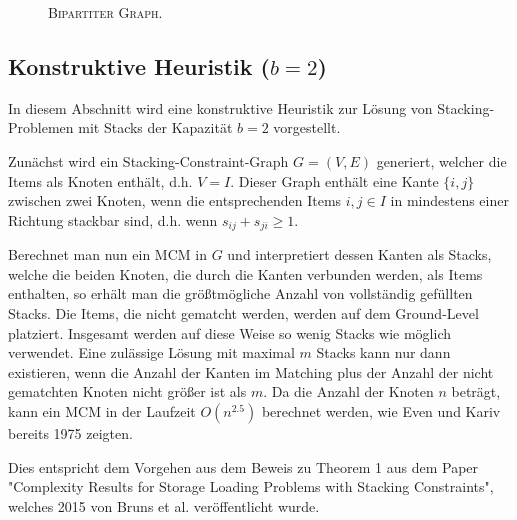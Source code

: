 \begin{figure}[H]
\centering
{}
\caption{\textsc{Bipartiter Graph.}}
\label{fig:digression_bipartite_graph}
\end{figure}

\subsection{Konstruktive Heuristik ($b = 2$)}
\label{sec:two_cap_heuristic}

In diesem Abschnitt wird eine konstruktive Heuristik zur Lösung von Stacking-Problemen mit Stacks der Kapazität $b=2$
vorgestellt.

Zunächst wird ein Stacking-Constraint-Graph $G = (V, E)$ generiert, welcher die Items als Knoten enthält, d.h. $V = I$. Dieser Graph
enthält eine Kante $\{i, j\}$ zwischen zwei Knoten, wenn die entsprechenden Items $i, j \in I$ in mindestens einer Richtung stackbar sind, d.h.
wenn $s_{ij} + s_{ji} \geq 1$.

Berechnet man nun ein \textsc{MCM} in $G$ und interpretiert dessen Kanten als Stacks, welche die beiden Knoten, die durch
die Kanten verbunden werden, als Items enthalten, so erhält man die größtmögliche Anzahl von vollständig gefüllten Stacks.
Die Items, die nicht gematcht werden, werden auf dem Ground-Level platziert.
Insgesamt werden auf diese Weise so wenig Stacks wie möglich verwendet.
Eine zulässige Lösung mit maximal $m$ Stacks kann nur dann existieren, wenn die Anzahl der Kanten im Matching plus der Anzahl der nicht gematchten Knoten nicht größer ist als $m$. Da die Anzahl der Knoten $n$ beträgt, kann ein \textsc{MCM} in der Laufzeit $O(n^{2.5})$ berechnet werden, wie Even und Kariv bereits 1975 zeigten.

Dies entspricht dem Vorgehen aus dem Beweis zu Theorem 1 aus dem Paper "Complexity Results for Storage Loading Problems with Stacking Constraints", welches 2015 von Bruns et al. veröffentlicht wurde.

